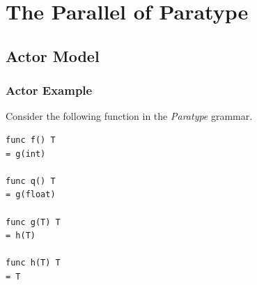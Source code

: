 \documentclass{beamer}
\begin{document}
\section{The Parallel of Paratype}

\subsection{Actor Model}


\begin{frame}[fragile]
  \frametitle{Actor Example}

  Consider the following function in the \emph{Paratype} grammar.
  \begin{lstlisting}[language=Paratype]
func f() T
= g(int)

func q() T
= g(float)

func g(T) T
= h(T)

func h(T) T
= T
  \end{lstlisting}
\end{frame}
\end{document}
